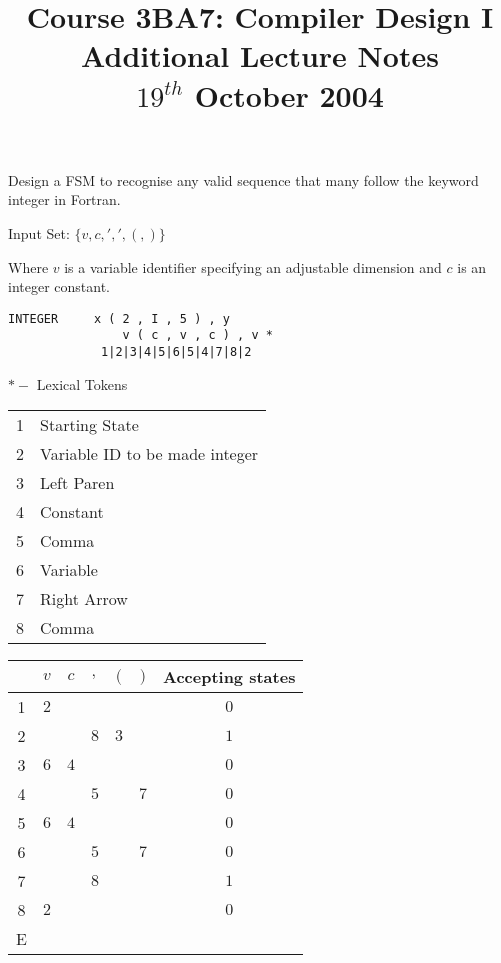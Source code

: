 \documentclass[a4paper,12pt]{article}
\begin{document}
\title{Course 3BA7: Compiler Design I \\ Additional Lecture Notes \\ $19^{th}$ October 2004}

\maketitle

Design a FSM to recognise any valid sequence that many follow the
keyword integer in Fortran.

Input Set: $\{v, c, ',', (, ) \}$

Where $v$ is a variable identifier specifying an adjustable dimension
and $c$ is an integer constant.

\begin{verbatim}
INTEGER 	x ( 2 , I , 5 ) , y
				v ( c , v , c ) , v * 
			 1|2|3|4|5|6|5|4|7|8|2
\end{verbatim}

$* -$ Lexical Tokens

\begin{tabular}{c l}
1 & Starting State 						\\
2 & Variable ID to be made integer	\\
3 & Left Paren								\\
4 & Constant								\\
5 & Comma									\\
6 & Variable								\\
7 & Right Arrow							\\
8 & Comma									\\
\end{tabular}

\begin{tabular}{|c|c|c|c|c|c|c|}
\hline
	&	$v$	&	$c$	&	$,$	&	$($	&	$)$	&	Accepting states \\
\hline
1	&	$2$	&			&			&			&			&	$0$					\\
\hline
2	&			&			&	$8$	&	$3$	&			&	$1$					\\
\hline
3	&	$6$	&	$4$	&			&			&			&	$0$					\\
\hline
4	&			&			&	$5$	&			&	$7$	&	$0$					\\
\hline
5	&	$6$	&	$4$	&			&			&			&	$0$					\\
\hline
6	&			&			&	$5$	&			&	$7$	&	$0$					\\
\hline
7	&			&			&	$8$	&			&			&	$1$					\\
\hline
8	&	$2$	&			&			&			&			&	$0$					\\
\hline
E	&			&			&			&			&			&							\\
\hline
\end{tabular}
\end{document}

